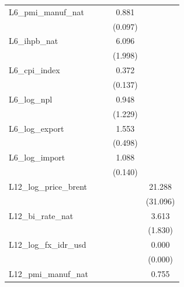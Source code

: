{\begin{tabular}{l*{4}{c}}
\addlinespace
L6\_pmi\_manuf\_nat&                  &                  &    0.881         &                  \\
                &                  &                  &  (0.097)         &                  \\
\addlinespace
L6\_ihpb\_nat     &                  &                  &    6.096\sym{***}&                  \\
                &                  &                  &  (1.998)         &                  \\
\addlinespace
L6\_cpi\_index    &                  &                  &    0.372\sym{***}&                  \\
                &                  &                  &  (0.137)         &                  \\
\addlinespace
L6\_log\_npl      &                  &                  &    0.948         &                  \\
                &                  &                  &  (1.229)         &                  \\
\addlinespace
L6\_log\_export   &                  &                  &    1.553         &                  \\
                &                  &                  &  (0.498)         &                  \\
\addlinespace
L6\_log\_import   &                  &                  &    1.088         &                  \\
                &                  &                  &  (0.140)         &                  \\
\addlinespace
L12\_log\_price\_brent&                  &                  &                  &   21.288\sym{**} \\
                &                  &                  &                  & (31.096)         \\
\addlinespace
L12\_bi\_rate\_nat &                  &                  &                  &    3.613\sym{**} \\
                &                  &                  &                  &  (1.830)         \\
\addlinespace
L12\_log\_fx\_idr\_usd&                  &                  &                  &    0.000\sym{*}  \\
                &                  &                  &                  &  (0.000)         \\
\addlinespace
L12\_pmi\_manuf\_nat&                  &                  &                  &    0.755\sym{*}  \\

\end{tabular}}
